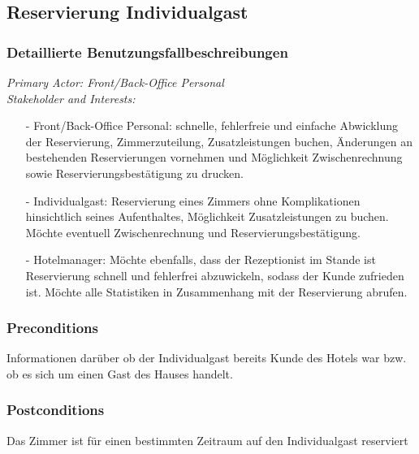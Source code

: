 \documentclass[./detailed_overview_usecases.tex]{subfiles}
\begin{document}
    \subsection{Reservierung Individualgast}
    \subsubsection{Detaillierte Benutzungsfallbeschreibungen}
    \textit{Primary Actor: Front/Back-Office Personal}
    \\
    \textit{Stakeholder and Interests:}
    \begin{itemize}
        \item[-] Front/Back-Office Personal: schnelle, fehlerfreie und einfache Abwicklung der Reservierung, Zimmerzuteilung, Zusatzleistungen buchen, Änderungen an bestehenden Reservierungen vornehmen und Möglichkeit Zwischenrechnung sowie Reservierungsbestätigung zu drucken.
        \item[-] Individualgast: Reservierung eines Zimmers ohne Komplikationen hinsichtlich seines Aufenthaltes, Möglichkeit Zusatzleistungen zu buchen. Möchte eventuell Zwischenrechnung und Reservierungsbestätigung.
        \item[-] Hotelmanager: Möchte ebenfalls, dass der Rezeptionist im Stande ist Reservierung schnell und fehlerfrei abzuwickeln, sodass der Kunde zufrieden ist. Möchte alle Statistiken in Zusammenhang mit der Reservierung abrufen.
    \end{itemize}

    \subsubsection*{Preconditions}
    Informationen darüber ob der Individualgast bereits Kunde des Hotels war bzw. ob es sich um einen Gast des Hauses handelt.

    \subsubsection*{Postconditions}
    Das Zimmer ist für einen bestimmten Zeitraum auf den Individualgast reserviert
\end{document}
